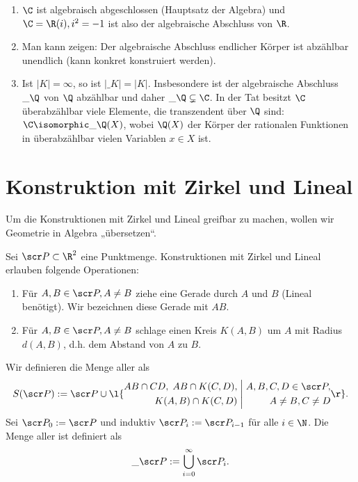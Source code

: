 \begin{nt} \label{18.4-10}
	\begin{enumerate}[1.)]
		\item
			$\C$ ist algebraisch abgeschlossen (Hauptsatz der Algebra) und $\C = \R(i), i^2 = -1$ ist also der algebraische Abschluss von $\R$.
		\item
			Man kann zeigen:
			Der algebraische Abschluss endlicher Körper ist abzählbar unendlich (kann konkret konstruiert werden).
		\item
			Ist $|K| = \infty$, so ist $|\_K| = |K|$.
			Insbesondere ist der algebraische Abschluss $\_\Q$ von $\Q$ abzählbar und daher $\_\Q \subsetneq \C$.
			In der Tat besitzt $\C$ überabzählbar viele Elemente, die transzendent über $\Q$ sind: $\C \isomorphic \_{\Q(X)}$, wobei $\Q(X)$ der Körper der rationalen Funktionen in überabzählbar vielen Variablen $x \in X$ ist.
	\end{enumerate}
\end{nt}


\section{Konstruktion mit Zirkel und Lineal}


Um die Konstruktionen mit Zirkel und Lineal greifbar zu machen, wollen wir Geometrie in Algebra „übersetzen“.

\begin{df} \label{18.5-1}
	Sei $\scr P \subset \R^2$ eine Punktmenge.
	Konstruktionen mit Zirkel und Lineal erlauben folgende Operationen:
	\begin{enumerate}[1)]
		\item
			Für $A, B \in \scr P, A \neq B$ ziehe eine Gerade durch $A$ und $B$ (Lineal benötigt).
			Wir bezeichnen diese Gerade mit $AB$.
		\item
			Für $A, B \in \scr P, A \neq B$ schlage einen Kreis $K(A, B)$ um $A$ mit Radius $d(A, B)$, d.h. dem Abstand von $A$ zu $B$.
	\end{enumerate}
	Wir definieren die Menge aller  als
	\[
		S(\scr P) :=
		\scr P \cup \l\{ \begin{aligned} AB \cap CD,\; AB \cap K(C, D), \\ K(A, B) \cap K(C, D) \end{aligned} \;\Bigg|\; \begin{aligned} A,B,C,D \in \scr P, \\ A \neq B, C \neq D \end{aligned} \r\}.
	\]
	Sei $\scr P_0 := \scr P$ und induktiv $\scr P_i := \scr P_{i-1}$ für alle $i \in \N$.
	Die Menge aller  ist definiert als
	\[
		\_{\scr P} := \bigcup_{i=0}^\infty \scr P_i.
	\]
\end{df}

